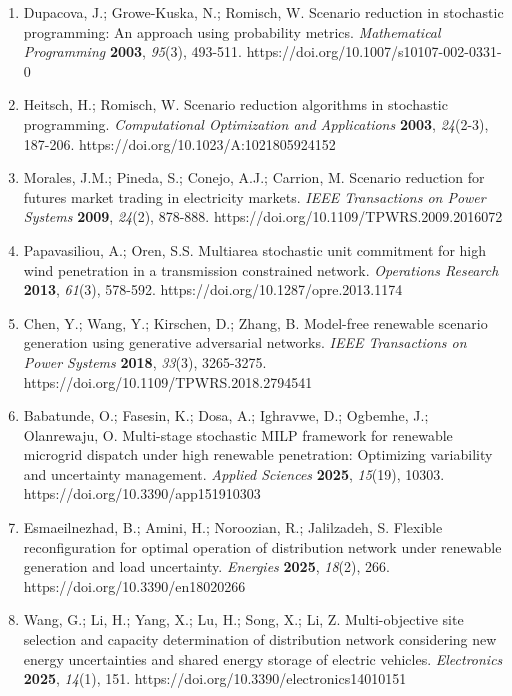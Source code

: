 \documentclass[
  10pt,
  a4paper,
]{article}
\begin{document}
\begin{enumerate}
  optimization methods. \emph{Energies} \textbf{2025}, \emph{18}(5),
  1076. https://doi.org/10.3390/en18051076
\item
  Dupacova, J.; Growe-Kuska, N.; Romisch, W. Scenario reduction in
  stochastic programming: An approach using probability metrics.
  \emph{Mathematical Programming} \textbf{2003}, \emph{95}(3), 493-511.
  https://doi.org/10.1007/s10107-002-0331-0
\item
  Heitsch, H.; Romisch, W. Scenario reduction algorithms in stochastic
  programming. \emph{Computational Optimization and Applications}
  \textbf{2003}, \emph{24}(2-3), 187-206.
  https://doi.org/10.1023/A:1021805924152
\item
  Morales, J.M.; Pineda, S.; Conejo, A.J.; Carrion, M. Scenario
  reduction for futures market trading in electricity markets.
  \emph{IEEE Transactions on Power Systems} \textbf{2009}, \emph{24}(2),
  878-888. https://doi.org/10.1109/TPWRS.2009.2016072
\item
  Papavasiliou, A.; Oren, S.S. Multiarea stochastic unit commitment for
  high wind penetration in a transmission constrained network.
  \emph{Operations Research} \textbf{2013}, \emph{61}(3), 578-592.
  https://doi.org/10.1287/opre.2013.1174
\item
  Chen, Y.; Wang, Y.; Kirschen, D.; Zhang, B. Model-free renewable
  scenario generation using generative adversarial networks. \emph{IEEE
  Transactions on Power Systems} \textbf{2018}, \emph{33}(3), 3265-3275.
  https://doi.org/10.1109/TPWRS.2018.2794541
\item
  Babatunde, O.; Fasesin, K.; Dosa, A.; Ighravwe, D.; Ogbemhe, J.;
  Olanrewaju, O. Multi-stage stochastic MILP framework for renewable
  microgrid dispatch under high renewable penetration: Optimizing
  variability and uncertainty management. \emph{Applied Sciences}
  \textbf{2025}, \emph{15}(19), 10303.
  https://doi.org/10.3390/app151910303
\item
  Esmaeilnezhad, B.; Amini, H.; Noroozian, R.; Jalilzadeh, S. Flexible
  reconfiguration for optimal operation of distribution network under
  renewable generation and load uncertainty. \emph{Energies}
  \textbf{2025}, \emph{18}(2), 266. https://doi.org/10.3390/en18020266
\item
  Wang, G.; Li, H.; Yang, X.; Lu, H.; Song, X.; Li, Z. Multi-objective
  site selection and capacity determination of distribution network
  considering new energy uncertainties and shared energy storage of
  electric vehicles. \emph{Electronics} \textbf{2025}, \emph{14}(1),
  151. https://doi.org/10.3390/electronics14010151

\end{enumerate}
\end{document}
